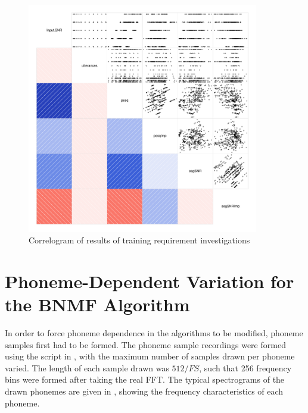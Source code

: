 \begin{figure}[h]


\noindent \begin{centering}
\includegraphics[width=0.9\textwidth]{fig/R/train/corr}
\par\end{centering}

\protect\caption{\label{fig:train-req-corr}Correlogram of results of training requirement
investigations}
\end{figure}



\section{Phoneme-Dependent Variation for the \acl{BNMF} Algorithm}

In order to force phoneme dependence in the algorithms to be modified,
phoneme samples first had to be formed. The phoneme sample recordings
were formed using the script in , with the
maximum number of samples drawn per phoneme varied. The length of
each sample drawn was $512/FS$, such that 256 frequency bins were
formed after taking the real \ac{FFT}. The typical spectrograms of
the drawn phonemes are given in ,
showing the frequency characteristics of each phoneme.

